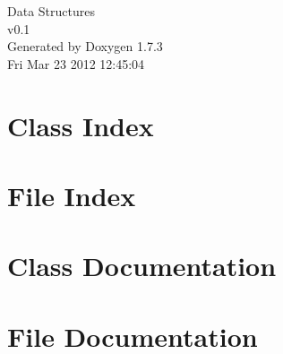 \documentclass[a4paper]{book}
\begin{document}
\hypersetup{pageanchor=false}
\begin{titlepage}
\vspace*{7cm}
\begin{center}
{\Large Data Structures \\[1ex]\large v0.1 }\\
\vspace*{1cm}
{\large Generated by Doxygen 1.7.3}\\
\vspace*{0.5cm}
{\small Fri Mar 23 2012 12:45:04}\\
\end{center}
\end{titlepage}
\clearemptydoublepage
{}
\tableofcontents
\clearemptydoublepage
{}
\hypersetup{pageanchor=true}
\chapter{Class Index}

\chapter{File Index}

\chapter{Class Documentation}





\chapter{File Documentation}












\printindex
\end{document}
